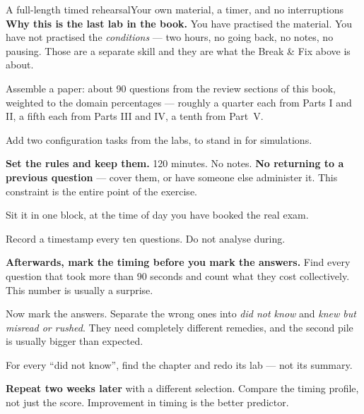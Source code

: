\begin{lab}{A full-length timed rehearsal}{Your own material, a timer, and no interruptions}
\textbf{Why this is the last lab in the book.} You have practised the material.
You have not practised the \emph{conditions} --- two hours, no going back, no
notes, no pausing. Those are a separate skill and they are what the Break \& Fix
above is about.

\begin{tasks}
  \item Assemble a paper: about 90 questions from the review sections of this
        book, weighted to the domain percentages --- roughly a quarter each from
        Parts I and II, a fifth each from Parts III and IV, a tenth from Part~V.
  \item Add two configuration tasks from the labs, to stand in for simulations.
  \item \textbf{Set the rules and keep them.} 120 minutes. No notes. \textbf{No
        returning to a previous question} --- cover them, or have someone else
        administer it. This constraint is the entire point of the exercise.
  \item Sit it in one block, at the time of day you have booked the real exam.
  \item Record a timestamp every ten questions. Do not analyse during.
  \item \textbf{Afterwards, mark the timing before you mark the answers.} Find
        every question that took more than 90 seconds and count what they cost
        collectively. This number is usually a surprise.
  \item Now mark the answers. Separate the wrong ones into \emph{did not know}
        and \emph{knew but misread or rushed}. They need completely different
        remedies, and the second pile is usually bigger than expected.
  \item For every ``did not know'', find the chapter and redo its lab --- not its
        summary.
  \item \textbf{Repeat two weeks later} with a different selection. Compare the
        timing profile, not just the score. Improvement in timing is the better
        predictor.
\end{tasks}
\end{lab}

